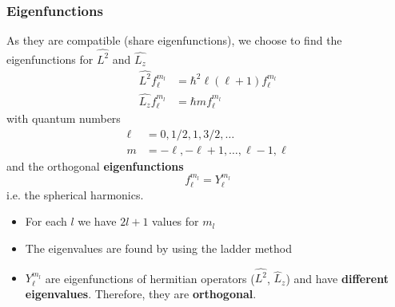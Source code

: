 \subsubsection{Eigenfunctions}

As they are compatible (share eigenfunctions), we choose to find the eigenfunctions for $\widehat{L^2}$ and $\widehat{L_z}$
\begin{align*}
    \widehat{L^2}f_{\ell}^{m_l} & =\hbar^{2}\ell (\ell+1) f_{\ell}^{m_l} \\
    \widehat{L_z}f_{\ell}^{m_l} & =\hbar mf_{\ell}^{m_l}
\end{align*}
with quantum numbers
\begin{align*}
    \ell & =0, 1/2, 1, 3/2,\ldots                \\
    m    & =-\ell, -\ell+1, \ldots, \ell-1, \ell
\end{align*}
and the orthogonal \textbf{eigenfunctions}
\begin{equation*}
    f_{\ell}^{m_l}=Y_{\ell}^{m_l}
\end{equation*}
i.e. the spherical harmonics.


\begin{itemize}
    \item For each $l$ we have $2l+1$ values for $m_l$
    \item The eigenvalues are found by using the ladder method
    \item $Y_{\ell}^{m_l}$ are eigenfunctions of hermitian operators ($\widehat{L^2}$, $\widehat{L}_{z}$) and have \textbf{different eigenvalues}. Therefore, they are \textbf{orthogonal}.
\end{itemize}


